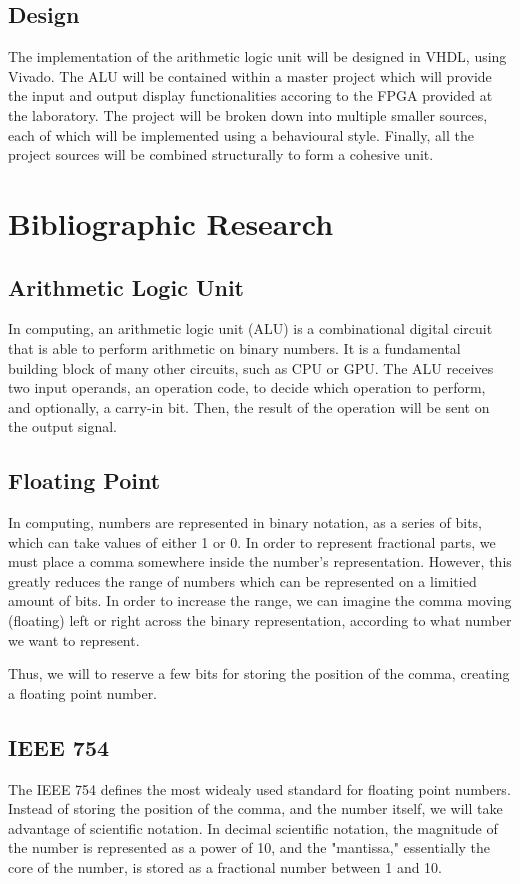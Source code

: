 \documentclass[a4paper,10pt]{article}
\begin{document}
    \subsection{Design}
    The implementation of the arithmetic logic unit will be designed in VHDL, using Vivado. The ALU will be contained within a master project which will provide the input and output display functionalities accoring to the FPGA provided at the laboratory. The project will be broken down into multiple smaller sources, each of which will be implemented using a behavioural style. Finally, all the project sources will be combined structurally to form a cohesive unit.

    \newpage

    \section{Bibliographic Research}
    \subsection{Arithmetic Logic Unit}
    In computing, an arithmetic logic unit (ALU) is a combinational digital circuit that is able to perform arithmetic on binary numbers. It is a fundamental building block of many other circuits, such as CPU or GPU.
    The ALU receives two input operands, an operation code, to decide which operation to perform, and optionally, a carry-in bit. Then, the result of the operation will be sent on the output signal.


    \subsection{Floating Point}
    In computing, numbers are represented in binary notation, as a series of bits, which can take values of either 1 or 0. In order to represent fractional parts, we must place a comma somewhere inside the number's representation. However, this greatly reduces the range of numbers which can be represented on a limitied amount of bits. In order to increase the range, we can imagine the comma moving (floating) left or right across the binary representation, according to what number we want to represent.

    Thus, we will to reserve a few bits for storing the position of the comma, creating a floating point number.

    \subsection{IEEE 754}
    The IEEE 754 defines the most widealy used standard for floating point numbers. Instead of storing the position of the comma, and the number itself, we will take advantage of scientific notation. In decimal scientific notation, the magnitude of the number is represented as a power of 10, and the "mantissa," essentially the core of the number, is stored as a fractional number between 1 and 10.
\end{document}
